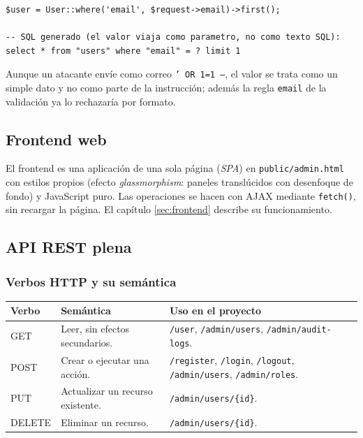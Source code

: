 \begin{lstlisting}[caption={Consulta del login y SQL equivalente generado}]
$user = User::where('email', $request->email)->first();

-- SQL generado (el valor viaja como parametro, no como texto SQL):
select * from "users" where "email" = ? limit 1
\end{lstlisting}
Aunque un atacante envíe como correo \texttt{' OR 1=1 --}, el valor se trata como un simple dato y no como parte de la instrucción; además la regla \texttt{email} de la validación ya lo rechazaría por formato.

\subsection{Frontend web}
El frontend es una aplicación de una sola página (\textit{SPA}) en \texttt{public/admin.html} con estilos propios (efecto \emph{glassmorphism}: paneles translúcidos con desenfoque de fondo) y JavaScript puro. Las operaciones se hacen con AJAX mediante \texttt{fetch()}, sin recargar la página. El capítulo \ref{sec:frontend} describe su funcionamiento.

\subsection{API REST plena}

\subsubsection{Verbos HTTP y su semántica}
\begin{longtable}{p{2cm}p{5cm}p{8cm}}
\toprule
\textbf{Verbo} & \textbf{Semántica} & \textbf{Uso en el proyecto} \\
\midrule
\endhead
GET & Leer, sin efectos secundarios. & \texttt{/user}, \texttt{/admin/users}, \texttt{/admin/audit-logs}. \\
POST & Crear o ejecutar una acción. & \texttt{/register}, \texttt{/login}, \texttt{/logout}, \texttt{/admin/users}, \texttt{/admin/roles}. \\
PUT & Actualizar un recurso existente. & \texttt{/admin/users/\{id\}}. \\
DELETE & Eliminar un recurso. & \texttt{/admin/users/\{id\}}. \\
\bottomrule
\end{longtable}

